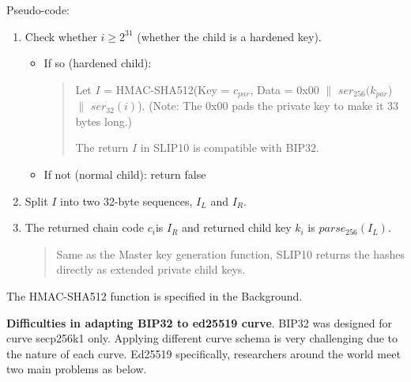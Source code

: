 Pseudo-code:
\begin{enumerate}
    \item Check whether $i \geq 2^{31}$ (whether the child is a hardened key).
          \begin{itemize}
              \item If so (hardened child):
                    \begin{quote}

                        Let $I$ = HMAC-SHA512(Key = $c_{par}$, Data = 0x00 $\parallel$ $ser_{256}(k_{par}$) $\parallel$ $ser_{32}(i)$). (Note: The 0x00 pads the private key to make it 33 bytes long.)

                        The return $I$ in SLIP10 is compatible with BIP32.
                    \end{quote}

              \item If not (normal child): return false

          \end{itemize}
          \bigskip

    \item Split $I$ into two 32-byte sequences, $I_L$ and $I_R$.
          \bigskip

    \item The returned chain code  $c_i$is $I_R$ and returned child key $k_i$ is $parse_{256}(I_L)$.
          \begin{quote}
              Same as the Master key generation function, SLIP10 returns the hashes directly as extended private child keys.
          \end{quote}
\end{enumerate}

The HMAC-SHA512 function is specified in the Background.

\bigskip
{\textbf{Difficulties in adapting BIP32 to ed25519 curve}}. BIP32 was designed for curve secp256k1 only. Applying different curve schema is very challenging due to the nature of each curve. Ed25519 specifically, researchers around the world meet two main problems as below.


